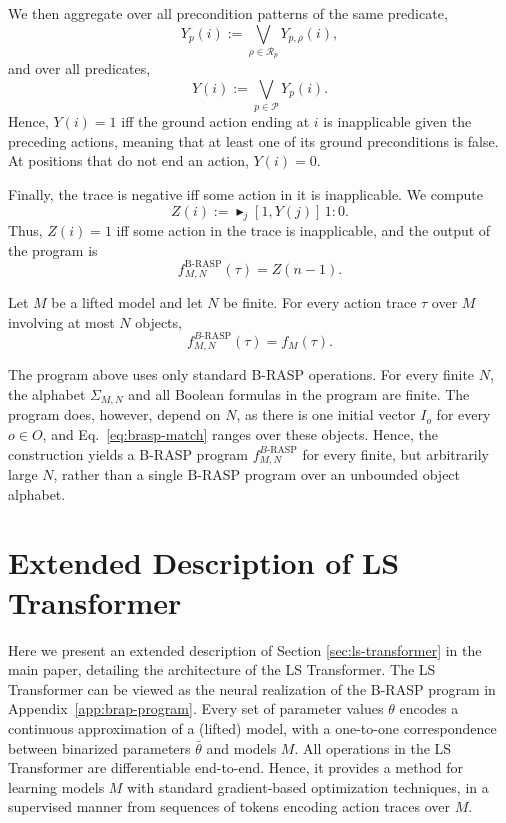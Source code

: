 We then aggregate over all precondition patterns of the same predicate,
\begin{equation}
Y_p(i)
:=
\bigvee_{\rho\in\mathcal{R}_p}
Y_{p,\rho}(i),
\label{eq:brasp-pattern-or}
\end{equation}
and over all predicates,
\begin{equation}
Y(i)
:=
\bigvee_{p\in\mathcal{P}}
Y_p(i).
\label{eq:brasp-predicate-or}
\end{equation}
Hence, $Y(i)=1$ iff the ground action ending at $i$ is inapplicable given
the preceding actions, meaning that at least one of its ground preconditions is false. At positions that do not end an action,
$Y(i)=0$.

Finally, the trace is negative iff some action in it is inapplicable. We
compute
\begin{equation}
Z(i)
:=
\blacktriangleright_j
[1,Y(j)]\,1:0.
\label{eq:brasp-output}
\end{equation}
Thus, $Z(i)=1$ iff some action in the trace is inapplicable, and the output
of the program is
\begin{equation}
f^{\text{B-RASP}}_{M,N}(\tau)
=
Z(n-1).
\label{eq:brasp-lifted-function}
\end{equation}

\begin{theorem}
\label{thm:brasp-lifted-strips}
Let $M$ be a lifted \strips model and let $N$ be finite. For every action
trace $\tau$ over $M$ involving at most $N$ objects,
\[
f^{B\text{-RASP}}_{M,N}(\tau)
=
f_M(\tau).
\]
\end{theorem}

The program above uses only standard B-RASP operations. For every finite
$N$, the alphabet $\Sigma_{M,N}$ and all Boolean formulas in the program are
finite. The program does, however, depend on $N$, as there is
one initial vector $I_o$ for every $o\in O$, and
Eq.~\ref{eq:brasp-match} ranges over these objects. Hence, the
construction yields a B-RASP program $f^{B\text{-RASP}}_{M,N}$ for every
finite, but arbitrarily large $N$, rather than a single B-RASP program
over an unbounded object alphabet.

\section{Extended Description of LS Transformer}
\label{app:ls-transformer-extended}

Here we present an extended description of Section \ref{sec:ls-transformer} in the main paper, detailing the architecture of the LS Transformer.
The LS Transformer can be viewed as the neural realization of the B-RASP program in Appendix~\ref{app:brap-program}. Every set of parameter values $\theta$ encodes a continuous approximation of a (lifted) \strips model, with a one-to-one correspondence between binarized parameters $\bar{\theta}$ and \strips models $M$.
All operations in the LS Transformer are differentiable end-to-end.
Hence, it provides a method for learning \strips models $M$ with standard gradient-based optimization techniques, in a supervised manner from sequences of tokens encoding action traces over $M$.


